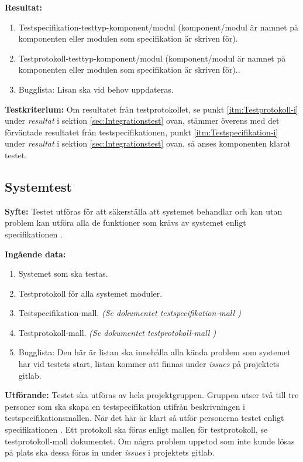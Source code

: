 \documentclass[a4paper,10pt]{article}
\begin{document}
\textbf{Resultat:}
    \begin{enumerate}
        \item \label{itm:Testspecifikation-i} Testspecifikation-testtyp-komponent/modul (komponent/modul är namnet på komponenten eller modulen som specifikation är skriven för).
        \item \label{itm:Testprotokoll-i} Testprotokoll-testtyp-komponent/modul (komponent/modul är namnet på komponenten eller modulen som specifikation är skriven för)..
        \item Bugglista: Lisan ska vid behov uppdateras.
    \end{enumerate}

\textbf{Testkriterium:} Om resultatet från testprotokollet, se punkt \ref{itm:Testprotokoll-i} under \emph{resultat} i sektion \ref{sec:Integrationstest} ovan, stämmer överens med det förväntade resultatet från testspecifikationen, punkt \ref{itm:Testspecifikation-i} under \emph{resultat} i sektion \ref{sec:Integrationstest} ovan, så anses komponenten klarat testet.

\subsection{Systemtest}
\label{sec:Systemtest}
\textbf{Syfte:}
Testet utföras för att säkerställa att systemet behandlar och kan utan problem kan utföra alla de funktioner som krävs av systemet enligt specifikationen \cite{kravspec}.

\textbf{Ingående data:}
   \begin{enumerate}
       \item Systemet som ska testas.
       \item Testprotokoll för alla systemet moduler.
       \item Testspecifikation-mall. \emph{(Se dokumentet testspecifikation-mall \cite{testspec-mall})}
       \item Testprotokoll-mall. \emph{(Se dokumentet testprotokoll-mall \cite{testprot-mall})}
       \item Bugglista: Den här är listan ska innehålla alla kända problem som systemet har vid testets start, listan kommer att finnas under \emph{issues} på projektets gitlab.
   \end{enumerate}

\textbf{Utförande:} Testet ska utföras av hela projektgruppen. Gruppen utser två till tre personer som ska skapa en testspecifikation utifrån beskrivningen i testspecifikationsmallen. När det här är klart så utför personerna testet enligt specifikationen \cite{kravspec}. Ett protokoll ska föras enligt mallen för testprotokoll, se testprotokoll-mall dokumentet. Om några problem uppstod som inte kunde lösas på plats ska dessa föras in under \emph{issues} i projektets gitlab.
\end{document}
